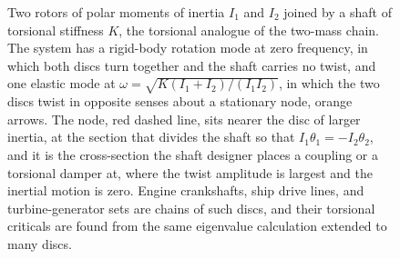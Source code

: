 \begin{figure}[htbp]
\centering
{}
\caption[Two-disc torsional oscillator and its mode]{Two rotors of
polar moments of inertia $I_1$ and $I_2$ joined by a shaft of torsional
stiffness $K$, the torsional analogue of the two-mass chain. The system
has a rigid-body rotation mode at zero frequency, in which both discs
turn together and the shaft carries no twist, and one elastic mode at
$\omega=\sqrt{K(I_1+I_2)/(I_1 I_2)}$, in which the two discs twist in
opposite senses about a stationary node, orange arrows. The node,
red dashed line, sits nearer the disc of larger inertia, at the section
that divides the shaft so that $I_1\theta_1=-I_2\theta_2$, and it is the
cross-section the shaft designer places a coupling or a torsional damper
at, where the twist amplitude is largest and the inertial motion is
zero. Engine crankshafts, ship drive lines, and turbine-generator sets
are chains of such discs, and their torsional criticals are found from
the same eigenvalue calculation extended to many discs.}
\label{fig:vol03ch06:torsional-2disc}
\end{figure}
